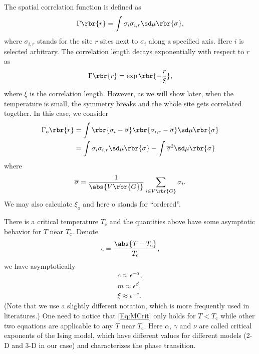 \documentclass[english, nochinese]{pnote}
\begin{document}
The spatial correlation function is defined as
\begin{equation} \label{Eq:Corr}
\Gamma \rbr{r} = \int \sigma_i \sigma_{ i, r } \sd \mu \rbr{\sigma},
\end{equation}
where $ \sigma_{ i, r } $ stands for the site $r$ sites next to $\sigma_i$ along a specified axis. Here $i$ is selected arbitrary. The correlation length decays exponentially with respect to $r$ as
\begin{equation}
\Gamma \rbr{r} = \exp \rbr{-\frac{r}{\xi}},
\end{equation}
where $\xi$ is the correlation length. However, as we will show later, when the temperature is small, the symmetry breaks and the whole site gets correlated together. In this case, we consider
\begin{equation}
\begin{split}
\Gamma_{\text{o}} \rbr{r} &= \int \rbr{ \sigma_i - \overline{\sigma} } \rbr{ \sigma_{ i, r } - \overline{\sigma} } \sd \mu \rbr{\sigma} \\
&= \int \sigma_i \sigma_{ i, r } \sd \mu \rbr{\sigma} - \int \overline{\sigma}^2 \sd \mu \rbr{\sigma}
\end{split}
\end{equation}
where
\begin{equation}
\overline{\sigma} = \frac{1}{\abs{ V \rbr{G} }} \sum_{ i \in V \rbr{G} } \sigma_i.
\end{equation}
We may also calculate $\xi_{\text{o}}$ and here o stands for ``ordered''.

There is a critical temperature $T_{\text{c}}$ and the quantities above have some asymptotic behavior for $T$ near $T_{\text{c}}$. Denote
\begin{equation}
\epsilon = \frac{\abs{ T - T_{\text{c} }}}{T_{\text{c}}},
\end{equation}
we have asymptotically
\begin{gather}
\label{Eq:MCrit}
c \approx \epsilon^{-\alpha}, \\
m \approx \epsilon^{\beta}, \\
\xi \approx \epsilon^{-\nu}.
\end{gather}
(Note that we use a slightly different notation, which is more frequently used in literatures.) One need to notice that \eqref{Eq:MCrit} only holds for $ T < T_{\text{c}} $ while other two equations are applicable to any $T$ near $T_{\text{c}}$. Here $\alpha$, $\gamma$ and $\nu$ are called critical exponents of the Ising model, which have different values for different models (2-D and 3-D in our case) and characterizes the phase transition.
\end{document}
